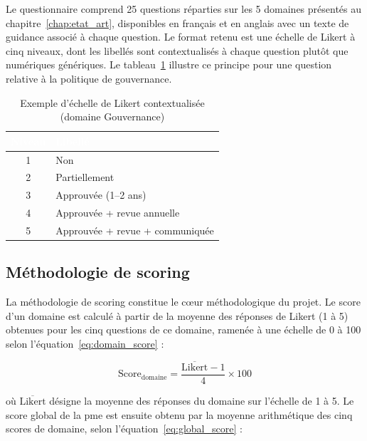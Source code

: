Le questionnaire comprend 25 questions réparties sur les 5 domaines présentés au chapitre~\ref{chap:etat_art}, disponibles en français et en anglais avec un texte de guidance associé à chaque question. Le format retenu est une échelle de Likert à cinq niveaux, dont les libellés sont contextualisés à chaque question plutôt que numériques génériques. Le tableau~\ref{tab:likert} illustre ce principe pour une question relative à la politique de gouvernance.

\begin{table}[H]
  \centering
  \caption{Exemple d'échelle de Likert contextualisée (domaine Gouvernance)}
  \label{tab:likert}
  \renewcommand{\arraystretch}{1.3}
  \begin{tabularx}{\textwidth}{|c|X|}
    \hline
    \rowcolor{iacsTableHead}
    \textcolor{white}{\textbf{Niveau}} & \textcolor{white}{\textbf{Libellé}} \\
    \hline
    1 & Non \\
    \hline
    \rowcolor{iacsLightGray}
    2 & Partiellement \\
    \hline
    3 & Approuvée (1--2 ans) \\
    \hline
    \rowcolor{iacsLightGray}
    4 & Approuvée + revue annuelle \\
    \hline
    5 & Approuvée + revue + communiquée \\
    \hline
  \end{tabularx}
\end{table}

\subsection{Méthodologie de scoring}
\label{sec:scoring}

\hspace{1cm}La méthodologie de scoring constitue le c\oe{}ur méthodologique du projet. Le score d'un domaine est calculé à partir de la moyenne des réponses de Likert (1 à 5) obtenues pour les cinq questions de ce domaine, ramenée à une échelle de 0 à 100 selon l'équation~\eqref{eq:domain_score} :

\begin{equation}
  \text{Score}_{\text{domaine}} = \frac{\overline{\text{Likert}} - 1}{4} \times 100
  \label{eq:domain_score}
\end{equation}

où $\overline{\text{Likert}}$ désigne la moyenne des réponses du domaine sur l'échelle de 1 à 5. Le score global de la \gls{pme} est ensuite obtenu par la moyenne arithmétique des cinq scores de domaine, selon l'équation~\eqref{eq:global_score} :

